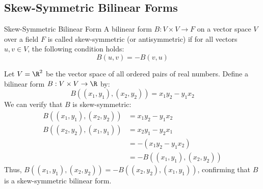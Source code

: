 \documentclass[openany]{book}
\begin{document}
\subsection{Skew-Symmetric Bilinear Forms}
\begin{mydefinition}{Skew-Symmetric Bilinear Form}
A bilinear form $B: V \times V \to F$ on a vector space $V$ over a field $F$ is called skew-symmetric (or antisymmetric) if for all vectors $u, v \in V$, the following condition holds:
$$B(u, v) = -B(v, u)$$
\end{mydefinition}
\begin{example}
Let $V = \R^2$ be the vector space of all ordered pairs of real numbers. Define a bilinear form $B: V \times V \to \R$ by:
$$B((x_1, y_1), (x_2, y_2)) = x_1y_2 - y_1x_2$$
We can verify that $B$ is skew-symmetric:
\[\begin{aligned}
B((x_1, y_1), (x_2, y_2)) &= x_1y_2 - y_1x_2 \\
B((x_2, y_2), (x_1, y_1)) &= x_2y_1 - y_2x_1 \\
&= -(x_1y_2 - y_1x_2) \\
&= -B((x_1, y_1), (x_2, y_2))
\end{aligned}\]
Thus, $B((x_1, y_1), (x_2, y_2)) = -B((x_2, y_2), (x_1, y_1))$, confirming that $B$ is a skew-symmetric bilinear form.
\end{example}
\end{document}
